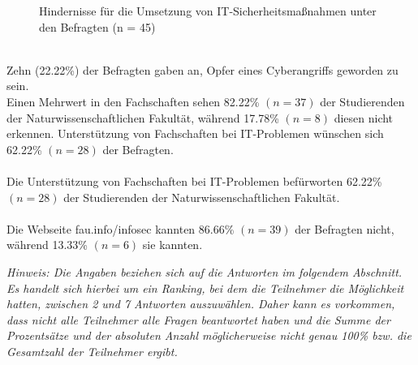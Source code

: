 \documentclass[german,report]{i1thesis}
\begin{document}
\begin{figure}[H]
\centering
{}
\caption{Hindernisse für die Umsetzung von IT-Sicherheitsmaßnahmen unter den Befragten (n = 45)}
\label{fig:hindernisse_it_sicherheit_balken}
\end{figure}
\\
Zehn (22.22\%) der Befragten gaben an, Opfer eines Cyberangriffs geworden zu sein.
\\
Einen Mehrwert in den Fachschaften sehen 82.22\% \((n = 37)\) der Studierenden der Naturwissenschaftlichen Fakultät, während 17.78\% \((n = 8)\) diesen nicht erkennen. Unterstützung von Fachschaften bei IT-Problemen wünschen sich 62.22\% \((n = 28)\) der Befragten.\\
\\
Die Unterstützung von Fachschaften bei IT-Problemen befürworten 62.22\% \((n = 28)\) der Studierenden der Naturwissenschaftlichen Fakultät.\\
\\
Die Webseite fau.info/infosec kannten 86.66\% \((n = 39)\) der Befragten nicht, während 13.33\% \((n = 6)\) sie kannten.

\textit{Hinweis: Die Angaben beziehen sich auf die Antworten im folgendem Abschnitt. Es handelt sich hierbei um ein Ranking, bei dem die Teilnehmer die Möglichkeit hatten, zwischen 2 und 7 Antworten auszuwählen. Daher kann es vorkommen, dass nicht alle Teilnehmer alle Fragen beantwortet haben und die Summe der Prozentsätze und der absoluten Anzahl möglicherweise nicht genau 100\% bzw. die Gesamtzahl der Teilnehmer ergibt.}
\end{document}
